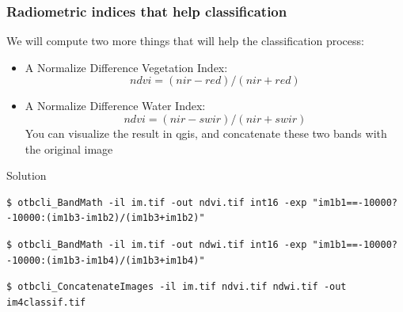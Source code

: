 \documentclass[8pt]{beamer}
\begin{document}
\begin{frame}[fragile]
\frametitle{Radiometric indices that help classification}

We will compute two more things that will help the classification process:
\begin{itemize}
\item A Normalize Difference Vegetation Index:
\begin{equation}
ndvi = (nir-red)/(nir+red)
\end{equation}
\item A Normalize Difference Water Index:
\begin{equation}
ndvi = (nir-swir)/(nir+swir)
\end{equation}
You can visualize the result in qgis, and concatenate these two bands with the original image
\end{itemize}

\begin{block}{Solution}
\begin{scriptsize}
\begin{verbatim}
$ otbcli_BandMath -il im.tif -out ndvi.tif int16 -exp "im1b1==-10000?-10000:(im1b3-im1b2)/(im1b3+im1b2)"
\end{verbatim}
\end{scriptsize}
\begin{scriptsize}
\begin{verbatim}
$ otbcli_BandMath -il im.tif -out ndwi.tif int16 -exp "im1b1==-10000?-10000:(im1b3-im1b4)/(im1b3+im1b4)"
\end{verbatim}
\end{scriptsize}
\begin{scriptsize}
\begin{verbatim}
$ otbcli_ConcatenateImages -il im.tif ndvi.tif ndwi.tif -out im4classif.tif
\end{verbatim}
\end{scriptsize}
\end{block}
\end{frame}
\end{document}
